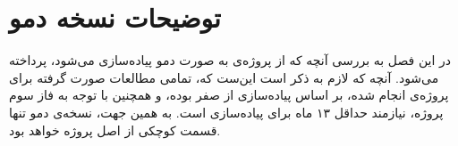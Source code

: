 \documentclass[11pt, oneside]{book}
\begin{document}
\frontmatter

\tableofcontents
\mainmatter

\chapter{توضیحات نسخه دمو}
در این فصل به بررسی آنچه که از پروژه‌ی 
به صورت دمو پیاده‌سازی می‌شود، پرداخته می‌شود. آنچه که لازم به ذکر است این‌ست که، تمامی مطالعات صورت گرفته برای پروژه‌ی
انجام شده، بر اساس پیاده‌سازی از صفر بوده، و همچنین با توجه به فاز سوم پروژه، نیازمند حداقل ۱۳ ماه برای پیاده‌سازی است. به همین جهت، نسخه‌ی دمو تنها قسمت کوچکی از اصل پروژه خواهد بود.
\end{document}
